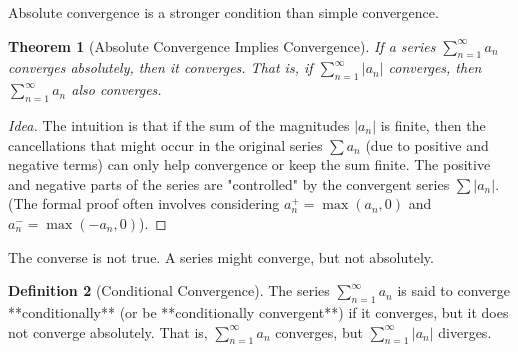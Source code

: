 \documentclass[11pt]{article}
\newtheorem{theorem}{Theorem}[section]
\theoremstyle{definition}
\newtheorem{definition}[theorem]{Definition}
\theoremstyle{remark}
\begin{document}
Absolute convergence is a stronger condition than simple convergence.

\begin{theorem}[Absolute Convergence Implies Convergence]
If a series $\sum_{n=1}^{\infty} a_n$ converges absolutely, then it converges.
That is, if $\sum_{n=1}^{\infty} |a_n|$ converges, then $\sum_{n=1}^{\infty} a_n$ also converges.
\end{theorem}

\begin{proof}[Idea]
The intuition is that if the sum of the magnitudes $|a_n|$ is finite, then the cancellations that might occur in the original series $\sum a_n$ (due to positive and negative terms) can only help convergence or keep the sum finite. The positive and negative parts of the series are "controlled" by the convergent series $\sum |a_n|$. (The formal proof often involves considering $a_n^+ = \max(a_n, 0)$ and $a_n^- = \max(-a_n, 0)$).
\end{proof}

The converse is not true. A series might converge, but not absolutely.

\begin{definition}[Conditional Convergence]
The series $\sum_{n=1}^{\infty} a_n$ is said to converge **conditionally** (or be **conditionally convergent**) if it converges, but it does not converge absolutely.
That is, $\sum_{n=1}^{\infty} a_n$ converges, but $\sum_{n=1}^{\infty} |a_n|$ diverges.
\end{definition}
\end{document}
